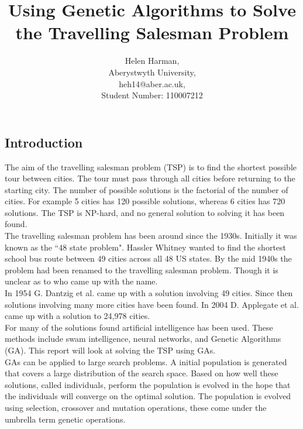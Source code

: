 \documentclass[10pt,a4paper,openbib]{article}
\author{Helen Harman, \\Aberystwyth University, \\heh14@aber.ac.uk,\\ Student Number: 110007212}
\title{Using Genetic Algorithms to Solve the Travelling Salesman Problem}
\begin{document}
\maketitle

\section*{\vspace{-1.2cm} }

\begin{multicols}{2}
\section{Introduction}
The aim of the travelling salesman problem (TSP) is to find the shortest possible tour between cities. The tour must pass through all cities before returning to the starting city. The number of possible solutions is the factorial of the number of cities. For example 5 cities has 120 possible solutions, whereas 6 cities has 720 solutions. The TSP is NP-hard, and no general solution to solving it has been found. \cite{tspMathWorld}\\

\noindent The travelling salesman problem has been around since the 1930s. Initially it was known as the ``48 state problem". Hassler Whitney wanted to find the shortest school bus route between 49 cities across all 48 US states. By the mid 1940s the problem had been renamed to the travelling salesman problem. \cite{tspBackgroundWebsite} Though it is unclear as to who came up with the name. \\

\noindent In 1954 G. Dantzig et al. \cite{Dantzig} came up with a solution involving 49 cities. Since then solutions involving many more cities have been found. In 2004 D. Applegate et al. came up with a solution to 24,978 cities.\cite{milestonesWebsite}\\

\noindent For many of the solutions found artificial intelligence has been used. These methods include swam intelligence, neural networks, and Genetic Algorithms (GA). This report will look at solving the TSP using GAs.\\


\noindent GAs can be applied to large search problems. A initial population is generated that covers a large distribution of the search space. Based on how well these solutions, called individuals, perform the population is evolved in the hope that the individuals will converge on the optimal solution. The population is evolved using selection, crossover and mutation operations, these come under the umbrella term genetic operations.\\



\end{multicols}
\end{document}
